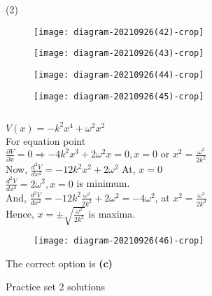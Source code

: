 \begin{enumerate}
	{}
\begin{tasks}(2)
	\task[\textbf{A.}]\begin{figure}[H]
		\centering
		\texttt{[image: diagram-20210926(42)-crop]}
	\end{figure}
	\task[\textbf{B.}]\begin{figure}[H]
		\centering
		\texttt{[image: diagram-20210926(43)-crop]}
	\end{figure}
	\task[\textbf{C.}]\begin{figure}[H]
		\centering
		\texttt{[image: diagram-20210926(44)-crop]}
	\end{figure}
	\task[\textbf{D.}]\begin{figure}[H]
		\centering
		\texttt{[image: diagram-20210926(45)-crop]}
	\end{figure}
\end{tasks}
\begin{answer}$\left. \right. $\\
	\begin{minipage}{0.5\textwidth}
	$V(x)=-k^{2} x^{4}+\omega^{2} x^{2}$\\
	For equation point\\
	$
	\frac{\partial V}{\partial x}=0 \Rightarrow-4 k^{2} x^{3}+2 \omega^{2} x=0, x=0 \text { or } x^{2}=\frac{\omega^{2}}{2 k^{2}}
	$\\
	Now, $\frac{d^{2} V}{d x^{2}}=-12 k^{2} x^{2}+2 \omega^{2}$ At, $x=0$\\
	$\frac{d^{2} V}{d x^{2}}=2 \omega^{2}, x=0$ is minimum.\\
	And, $\frac{d^{2} V}{d x^{2}}=-12 k^{2} \frac{\omega^{2}}{2 k^{2}}+2 \omega^{2}=-4 \omega^{2}$, at $x^{2}=\frac{\omega^{2}}{2 k^{2}}$\\
	Hence, $x=\pm \sqrt{\frac{\omega^{2}}{2 k^{2}}}$ is maxima.
	\end{minipage}
	 \begin{minipage}{0.5\textwidth}
	 \begin{figure}[H]
	 	\centering
	 	\texttt{[image: diagram-20210926(46)-crop]}
	 \end{figure}
	 \end{minipage}
 The correct option is \textbf{(c)}
\end{answer}
\end{enumerate}
\newpage
\begin{abox}
	Practice set 2 solutions
	\end{abox}
